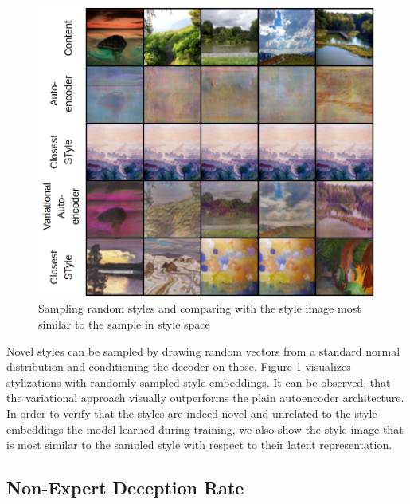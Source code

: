 \documentclass[10pt,twocolumn,letterpaper]{article}
\begin{document}
\begin{figure}
\centering
\includegraphics[width=0.9\linewidth]{sampling.png}
\caption{Sampling random styles and comparing with the style image most similar to the sample in style space}
\label{fig:sampling}
\end{figure}

Novel styles can be sampled by drawing random vectors from a standard normal distribution and conditioning the decoder on those. Figure \ref{fig:sampling} visualizes stylizations with randomly sampled style embeddings. It can be observed, that the variational approach visually outperforms the plain autoencoder architecture. In order to verify that the styles are indeed novel and unrelated to the style embeddings the model learned during training, we also show the style image that is most similar to the sampled style with respect to their latent representation. 

\subsection{Non-Expert Deception Rate}
\end{document}
